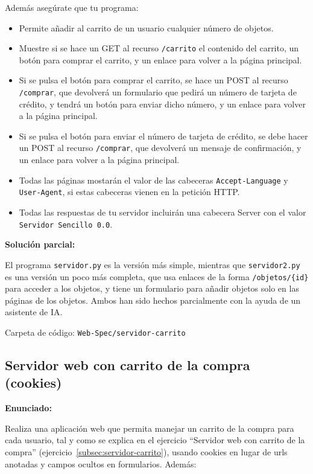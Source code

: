 Además asegúrate que tu programa:

\begin{itemize}
\item Permite añadir al carrito de un usuario cualquier número de objetos.
\item Muestre si se hace un GET al recurso \texttt{/carrito} el contenido del carrito, un botón para comprar el carrito, y un enlace para volver a la página principal.
\item Si se pulsa el botón para comprar el carrito, se hace un POST al recurso \texttt{/comprar}, que devolverá un formulario que pedirá un número de tarjeta de crédito, y tendrá un botón para enviar dicho número, y un enlace para volver a la página principal.
\item Si se pulsa el botón para enviar el número de tarjeta de crédito, se debe hacer un POST al recurso \texttt{/comprar}, que devolverá un mensaje de confirmación, y un enlace para volver a la página principal.
\item Todas las páginas mostarán el valor de las cabeceras \texttt{Accept-Language} y \texttt{User-Agent}, si estas cabeceras vienen en la petición HTTP.
\item Todas las respuestas de tu servidor incluirán una cabecera Server con el valor \texttt{Servidor Sencillo 0.0}.
\end{itemize}

\textbf{Solución parcial:}

El programa \texttt{servidor.py} es la versión más simple, mientras que \texttt{servidor2.py} es una versión un poco más completa, que usa enlaces de la forma \texttt{/objetos/\{id\}} para acceder a los objetos, y tiene un formulario para añadir objetos solo en las páginas de los objetos. Ambos han sido hechos parcialmente con la ayuda de un asistente de IA.

Carpeta de código: \texttt{Web-Spec/servidor-carrito}

\subsection{Servidor web con carrito de la compra (cookies)}
\label{subsec:servidor-carrito-cookies}

\textbf{Enunciado:}

Realiza una aplicación web que permita manejar un carrito de la compra para cada usuario, tal y como se explica en el ejercicio ``Servidor web con carrito de la compra'' (ejercicio~\ref{subsec:servidor-carrito}), usando cookies en lugar de urls anotadas y campos ocultos en formularios. Además:

